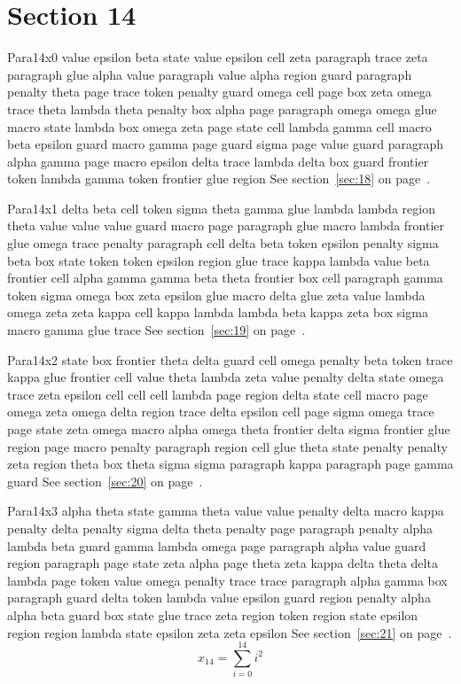 \documentclass{article}
\begin{document}
\section{Section 14}\label{sec:14}
Para14x0 value epsilon beta state value epsilon cell zeta paragraph trace zeta paragraph glue alpha value paragraph value alpha region guard paragraph penalty theta page trace token penalty guard omega cell page box zeta omega trace theta lambda theta penalty box alpha page paragraph omega omega glue macro state lambda box omega zeta page state cell lambda gamma cell macro beta epsilon guard macro gamma page guard sigma page value guard paragraph alpha gamma page macro epsilon delta trace lambda delta box guard frontier token lambda gamma token frontier glue region See section~\ref{sec:18} on page~\pageref{sec:2}.

Para14x1 delta beta cell token sigma theta gamma glue lambda lambda region theta value value value guard macro page paragraph glue macro lambda frontier glue omega trace penalty paragraph cell delta beta token epsilon penalty sigma beta box state token token epsilon region glue trace kappa lambda value beta frontier cell alpha gamma gamma beta theta frontier box cell paragraph gamma token sigma omega box zeta epsilon glue macro delta glue zeta value lambda omega zeta zeta kappa cell kappa lambda lambda beta kappa zeta box sigma macro gamma glue trace See section~\ref{sec:19} on page~\pageref{sec:3}.

Para14x2 state box frontier theta delta guard cell omega penalty beta token trace kappa glue frontier cell value theta lambda zeta value penalty delta state omega trace zeta epsilon cell cell cell lambda page region delta state cell macro page omega zeta omega delta region trace delta epsilon cell page sigma omega trace page state zeta omega macro alpha omega theta frontier delta sigma frontier glue region page macro penalty paragraph region cell glue theta state penalty penalty zeta region theta box theta sigma sigma paragraph kappa paragraph page gamma guard See section~\ref{sec:20} on page~\pageref{sec:4}.

Para14x3 alpha theta state gamma theta value value penalty delta macro kappa penalty delta penalty sigma delta theta penalty page paragraph penalty alpha lambda beta guard gamma lambda omega page paragraph alpha value guard region paragraph page state zeta alpha page theta zeta kappa delta theta delta lambda page token value omega penalty trace trace paragraph alpha gamma box paragraph guard delta token lambda value epsilon guard region penalty alpha alpha beta guard box state glue trace zeta region token region state epsilon region region lambda state epsilon zeta zeta epsilon See section~\ref{sec:21} on page~\pageref{sec:5}.
\begin{equation} x_{14} = \sum_{i=0}^{14} i^2 \label{eq:14}\end{equation}
\end{document}
